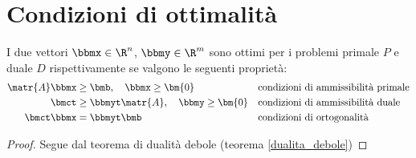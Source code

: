 \documentclass[\main/main.tex]{subfiles}
\begin{document}
\section{Condizioni di ottimalità}
\begin{theorem}
  I due vettori $\bbmx \in \R^n$,  $\bbmy \in \R^m$ sono ottimi per i problemi primale $P$ e duale $D$ rispettivamente se valgono le seguenti proprietà:
  \begin{align*}
    \matr{A}\bbmx & \geq \bmb,\quad \bbmx \geq \bm{0}            &  & \text{condizioni di ammissibilità primale} \\
    \bmct         & \geq \bbmyt \matr{A},\quad \bbmy \geq \bm{0} &  & \text{condizioni di ammissibilità duale}   \\
    \bmct \bbmx   & = \bbmyt \bmb                                &  & \text{condizioni di ortogonalità}
  \end{align*}
\end{theorem}

\begin{proof}
  Segue dal teorema di dualità debole (teorema \ref{dualita_debole})
\end{proof}
\end{document}
